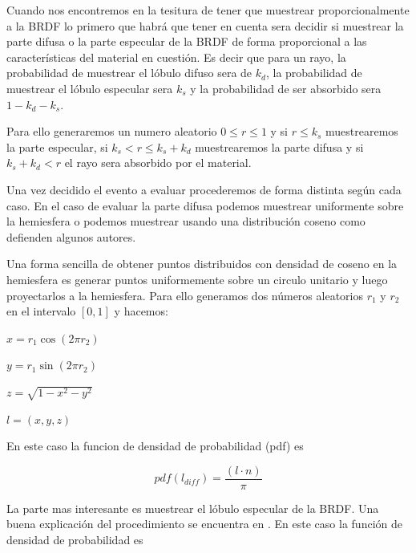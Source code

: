 \medskip
Cuando nos encontremos en la tesitura de tener que muestrear proporcionalmente a la BRDF lo primero que habrá que tener en cuenta sera decidir si muestrear la parte difusa o la parte especular de la BRDF de forma proporcional a las características del material en cuestión. Es decir que para un rayo, la probabilidad de muestrear el lóbulo difuso sera de $k_d$, la probabilidad de muestrear el lóbulo especular sera $k_s$ y la probabilidad de ser absorbido sera $1 - k_d - k_s$.

\medskip

Para ello generaremos un numero aleatorio $0 \leq r \leq 1$ y si
$r \leq k_s$ muestrearemos la parte especular,
si $k_s < r \leq k_s + k_d$ muestrearemos la parte difusa
y si $k_s + k_d < r$ el rayo sera absorbido por el material.

\medskip

Una vez decidido el evento a evaluar procederemos de forma distinta según cada caso. En el caso de evaluar la parte difusa podemos muestrear uniformente sobre la hemiesfera o podemos muestrear usando una distribución coseno como defienden algunos autores.

\clearpage

Una forma sencilla de obtener puntos distribuidos con densidad de coseno en la hemiesfera es generar puntos uniformemente sobre un circulo unitario y luego proyectarlos a la hemiesfera.
Para ello generamos dos números aleatorios $r_1$ y $r_2$ en el intervalo $[0, 1]$ y hacemos:

\smallskip

$x = r_1 \cos (2\pi r_2)$

\smallskip

$y = r_1 \sin (2\pi r_2)$

\smallskip

$z = \sqrt{1 - x^2 - y^2}$

\smallskip

$l = (x, y, z)$

\medskip

En este caso la funcion de densidad de probabilidad (pdf) es

\smallskip

\begin{equation}
pdf(l_{diff}) = \frac{(l \cdot n)}{\pi}
\end{equation}

La parte mas interesante es muestrear el lóbulo especular de la BRDF. Una buena explicación del procedimiento se encuentra en \cite{Lafortune1994}. En este caso la función de densidad de probabilidad es


